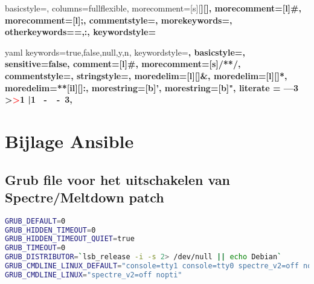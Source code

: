 

\newcommand\YAMLcolonstyle{\color{red}\mdseries}
\newcommand\YAMLkeystyle{\color{black}\bfseries}
\newcommand\YAMLvaluestyle{\color{blue}\mdseries}

\makeatletter

{
	basicstyle=\ttfamily\small,
	columns=fullflexible,
	morecomment=[s][\color{Orchid}\bfseries]{[}{]},
	morecomment=[l]{\#},
	morecomment=[l]{;},
	commentstyle=\color{gray}\ttfamily,
	morekeywords={},
	otherkeywords={=,:},
	keywordstyle={\color{green}\bfseries}
}




\newcommand\language@yaml{yaml}

\expandafter\expandafter\expandafter\lstdefinelanguage
\expandafter{\language@yaml}
{
	keywords={true,false,null,y,n},
	keywordstyle=\color{darkgray}\bfseries,
	basicstyle=\YAMLkeystyle,                                 %
	sensitive=false,
	comment=[l]{\#},
	morecomment=[s]{/*}{*/},
	commentstyle=\color{purple}\ttfamily,
	stringstyle=\YAMLvaluestyle\ttfamily,
	moredelim=[l][\color{orange}]{\&},
	moredelim=[l][\color{magenta}]{*},
	moredelim=**[il][\YAMLcolonstyle{:}\YAMLvaluestyle]{:},   %
	morestring=[b]',
	morestring=[b]",
	literate =    {---}{{\ProcessThreeDashes}}3
	{>}{{\textcolor{red}\textgreater}}1     
	{|}{{\textcolor{red}\textbar}}1 
	{\ -\ }{{\mdseries\ -\ }}3,
}

\lst@AddToHook{EveryLine}{\ifx\lst@language\language@yaml\YAMLkeystyle\fi}
\makeatother

\newcommand\ProcessThreeDashes{\llap{\color{cyan}\mdseries-{-}-}}




\section{Bijlage Ansible}
\subsection{Grub file voor het uitschakelen van Spectre/Meltdown patch}

\begin{lstlisting}[language=bash, basicstyle=\footnotesize]
GRUB_DEFAULT=0
GRUB_HIDDEN_TIMEOUT=0
GRUB_HIDDEN_TIMEOUT_QUIET=true
GRUB_TIMEOUT=0
GRUB_DISTRIBUTOR=`lsb_release -i -s 2> /dev/null || echo Debian`
GRUB_CMDLINE_LINUX_DEFAULT="console=tty1 console=tty0 spectre_v2=off nopti"
GRUB_CMDLINE_LINUX="spectre_v2=off nopti"

\end{lstlisting}

